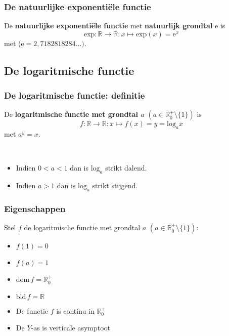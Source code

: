 \begin{frame}  
\frametitle{De natuurlijke exponenti\"ele functie} 
\pause
\begin{definitie}
De {\bfseries natuurlijke exponenti\"ele functie} met {\bfseries natuurlijk grondtal} e is
\[\mbox{exp}:\mathbb{R} \rightarrow \mathbb{R}:x\mapsto \mbox{exp}(x)=\mbox{e}^x\]
met  ($\mbox{e}=2,7182818284\ldots)$. 
\end{definitie}
\end{frame}

\subsection{De logaritmische functie}
\begin{frame}
\frametitle{De logaritmische functie: definitie} 
\pause
\begin{definitie} 
De {\bfseries logaritmische functie met grondtal $a$} $(a\in \mathbb{R}_0^+\setminus \{1\})$  is
\[f:\mathbb{R} \rightarrow \mathbb{R}:x\mapsto f(x)=y=\mbox{log}_a x\]
met $a^y=x$.
\end{definitie}
~\\
\pause
\begin{itemize}
\item<+-> Indien $0<a<1$ dan is $\mbox{log}_a$ strikt dalend. 
\item<+-> Indien $a>1$ dan is $\mbox{log}_a$ strikt stijgend. 
\end{itemize}
\end{frame}

\begin{frame}
\frametitle{Eigenschappen}
\pause
\begin{eigenschap}
Stel $f$ de logaritmische functie met grondtal $a$ $(a\in\mathbb{R}_0^{+}\setminus \{1\})$:
 
\pause
\begin{itemize}
\item<+-> $f(1)=0$ 
\item<+-> $f(a)=1$ 
\item<+-> $\mbox{dom}\, f=\mathbb{R}^+_0$
\item<+-> $\mbox{bld}\, f=\mathbb{R}$
\item<+-> De functie $f$ is continu in $\mathbb{R}^+_0$
\item<+-> De $Y$-as is verticale asymptoot
\end{itemize}  
\end{eigenschap} 
\end{frame}

